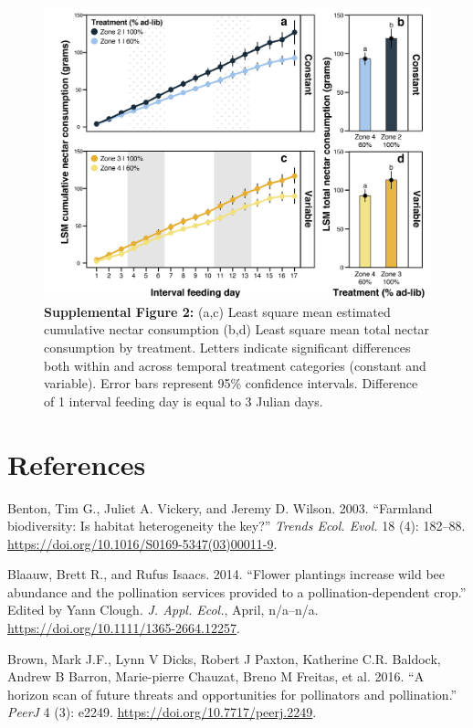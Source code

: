 \documentclass[11pt,]{article}
\begin{document}
\begin{figure}
\centering
\includegraphics{./supfig2_nectar.png}
\caption{\textbf{Supplemental Figure 2:} (a,c) Least square mean
estimated cumulative nectar consumption (b,d) Least square mean total
nectar consumption by treatment. Letters indicate significant
differences both within and across temporal treatment categories
(constant and variable). Error bars represent 95\% confidence intervals.
Difference of 1 interval feeding day is equal to 3 Julian days.}
\end{figure}

\hypertarget{references}{%
\section*{References}\label{references}}

\hypertarget{refs}{}
\leavevmode\hypertarget{ref-Benton2003}{}%
Benton, Tim G., Juliet A. Vickery, and Jeremy D. Wilson. 2003.
``Farmland biodiversity: Is habitat heterogeneity the key?''
\emph{Trends Ecol. Evol.} 18 (4): 182--88.
\url{https://doi.org/10.1016/S0169-5347(03)00011-9}.

\leavevmode\hypertarget{ref-Blaauw2014}{}%
Blaauw, Brett R., and Rufus Isaacs. 2014. ``Flower plantings increase
wild bee abundance and the pollination services provided to a
pollination-dependent crop.'' Edited by Yann Clough. \emph{J. Appl.
Ecol.}, April, n/a--n/a. \url{https://doi.org/10.1111/1365-2664.12257}.

\leavevmode\hypertarget{ref-Brown2016a}{}%
Brown, Mark J.F., Lynn V Dicks, Robert J Paxton, Katherine C.R. Baldock,
Andrew B Barron, Marie-pierre Chauzat, Breno M Freitas, et al. 2016. ``A
horizon scan of future threats and opportunities for pollinators and
pollination.'' \emph{PeerJ} 4 (3): e2249.
\url{https://doi.org/10.7717/peerj.2249}.
\end{document}
